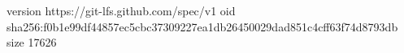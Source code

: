 version https://git-lfs.github.com/spec/v1
oid sha256:f0b1e99df44857ec5cbc37309227ea1db26450029dad851c4cff63f74d8793db
size 17626
